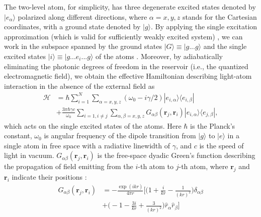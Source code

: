 \documentclass[aps,pra,reprint,groupedaddress,nofootinbib,longbibliography,showpacs]{revtex4-1}
\begin{document}
The two-level atom, for simplicity, has three degenerate excited states denoted by $|e_{\alpha}\rangle$ polarized along different directions, where $\alpha=x,y,z$ stands for the Cartesian coordinates, with a ground state denoted by $|g\rangle$. By applying the single excitation approximation (which is valid for sufficiently weakly excited system) \cite{kaiserJMO2011,kaiserFP2012,guerinPRL2016}, we can work in the subspace spanned by the ground states $|G\rangle\equiv|g...g\rangle$ and the single excited states $|i\rangle\equiv|g...e_i...g\rangle$ of the atoms \cite{kaiserJMO2011,kaiserFP2012,guerinPRL2016}. Moreover, by adiabatically eliminating the photonic degrees of freedom in the reservoir (i.e., the quantized electromagnetic field), we obtain the effective Hamiltonian describing light-atom interaction in the absence of the external field as \cite{antezzaPRL2009,antezzaPRA2009,kaiserJMO2011,kaiserFP2012,guerinPRL2016,perczelPRA2017,yelinPRL2017,yelinPRL20172} 
\begin{equation}\label{Hamiltonian}
\begin{split}
\mathcal{H}&=\hbar\sum_{i=1}^N\sum_{\alpha=x,y,z}(\omega_0-i\gamma/2)|e_{i,\alpha}\rangle\langle e_{i,\beta}|\\&+\frac{3\pi\hbar\gamma c}{\omega_0}\sum_{i=1,i\neq j}\sum_{\alpha,\beta=x,y,z}G_{\alpha\beta}(\mathbf{r}_j,\mathbf{r}_i)|e_{i,\alpha}\rangle\langle e_{j,\beta}|,
\end{split}
\end{equation}
which acts on the single excited states of the atoms. Here $\hbar$ is the Planck's constant, $\omega_0$ is angular frequency of the dipole transition from $|g\rangle$ to $|e\rangle$ in a single atom in free space with a radiative linewidth of $\gamma$, and $c$ is the speed of light in vacuum. $G_{\alpha\beta}(\mathbf{r}_j,\mathbf{r}_i)$ is the free-space dyadic Green's function describing the propagation of field emitting from the $i$-th atom to $j$-th atom, where $\mathbf{r}_j$ and $\mathbf{r}_i$ indicate their positions \cite{svidzinskyPRA2010,guerinPRL2016}:
\begin{equation}
\begin{split}
G_{\alpha\beta}(\mathbf{r}_j,\mathbf{r}_i)&=-\frac{\exp{(ikr)}}{4\pi r}\Big[\Big(1+\frac{i}{kr}-\frac{1}{(kr)^2}\Big)\delta_{\alpha\beta}\\&+\Big(-1-\frac{3i}{kr}+\frac{3}{(kr)^2}\Big)\hat{r}_{\alpha}\hat{r}_{\beta}\Big]
\end{split}
\end{equation}
\end{document}
